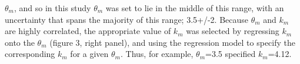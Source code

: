 $\theta_{m}$, and so in this study $\theta_{m}$ was set to lie in the middle of this range, with an uncertainty that spans the majority of this range; 3.5+/-2. Because $\theta_{m}$ and $k_{m}$ are highly correlated, the appropriate value of $k_{m}$ was selected by regressing $k_{m}$ onto the $\theta_{m}$ (figure 3, right panel), and
using the regression model to specify the corresponding $k_{m}$ for a given $\theta_{m}$. Thus, for example, $\theta_m$=3.5 specified $k_m$=4.12.




